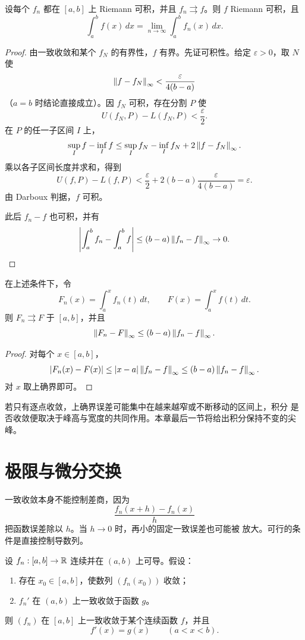 \begin{theorem}
\label{thm:uniform-limit-riemann-integrable}
设每个 \(f_n\) 都在 \([a,b]\) 上 Riemann 可积，并且
\(f_n\rightrightarrows f\)。则 \(f\) Riemann 可积，且
\[
 \int_a^b f(x)\,dx
 =\lim_{n\to\infty}\int_a^b f_n(x)\,dx.
\]
\end{theorem}

\begin{proof}
由一致收敛和某个 \(f_N\) 的有界性，\(f\) 有界。先证可积性。给定
\(\varepsilon>0\)，取 \(N\) 使
\[
 \left\lVert f-f_N\right\rVert_\infty<\frac{\varepsilon}{4(b-a)}
\]
（\(a=b\) 时结论直接成立）。因 \(f_N\) 可积，存在分割 \(P\) 使
\[
 U(f_N,P)-L(f_N,P)<\frac{\varepsilon}{2}.
\]
在 \(P\) 的任一子区间 \(I\) 上，
\[
 \sup_I f-\inf_I f
 \le \sup_I f_N-\inf_I f_N+2\left\lVert f-f_N\right\rVert_\infty.
\]
乘以各子区间长度并求和，得到
\[
 U(f,P)-L(f,P)
 <\frac{\varepsilon}{2}
   +2(b-a)\frac{\varepsilon}{4(b-a)}
 =\varepsilon.
\]
由 Darboux 判据，\(f\) 可积。

此后 \(f_n-f\) 也可积，并有
\[
 \left|\int_a^b f_n-\int_a^b f\right|
 \le(b-a)\left\lVert f_n-f\right\rVert_\infty\to0.
\]
\end{proof}

\begin{corollary}[积分上限函数的一致收敛]
在上述条件下，令
\[
 F_n(x)=\int_a^x f_n(t)\,dt,\qquad
 F(x)=\int_a^x f(t)\,dt.
\]
则 \(F_n\rightrightarrows F\) 于 \([a,b]\)，并且
\[
 \left\lVert F_n-F\right\rVert_\infty
 \le(b-a)\left\lVert f_n-f\right\rVert_\infty.
\]
\end{corollary}

\begin{proof}
对每个 \(x\in[a,b]\)，
\[
 |F_n(x)-F(x)|
 \le |x-a|\left\lVert f_n-f\right\rVert_\infty
 \le(b-a)\left\lVert f_n-f\right\rVert_\infty.
\]
对 \(x\) 取上确界即可。
\end{proof}

若只有逐点收敛，上确界误差可能集中在越来越窄或不断移动的区间上，积分
是否收敛便取决于峰高与宽度的共同作用。本章最后一节将给出积分保持不变的尖峰。

\section{极限与微分交换}

一致收敛本身不能控制差商，因为
\[
 \frac{f_n(x+h)-f_n(x)}{h}
\]
把函数误差除以 \(h\)。当 \(h\to0\) 时，再小的固定一致误差也可能被
放大。可行的条件是直接控制导数列。

\begin{theorem}[逐项求导定理]
\label{thm:uniform-derivative-limit}
设 \(f_n:[a,b]\to\mathbb{R}\) 连续并在 \((a,b)\) 上可导。假设：
\begin{enumerate}[label=\textup{(\roman*)}]
 \item 存在 \(x_0\in[a,b]\)，使数列 \((f_n(x_0))\) 收敛；
 \item \(f_n'\) 在 \((a,b)\) 上一致收敛于函数 \(g\)。
\end{enumerate}
则 \((f_n)\) 在 \([a,b]\) 上一致收敛于某个连续函数 \(f\)，并且
\[
 f'(x)=g(x)\qquad(a<x<b).
\]
\end{theorem}

